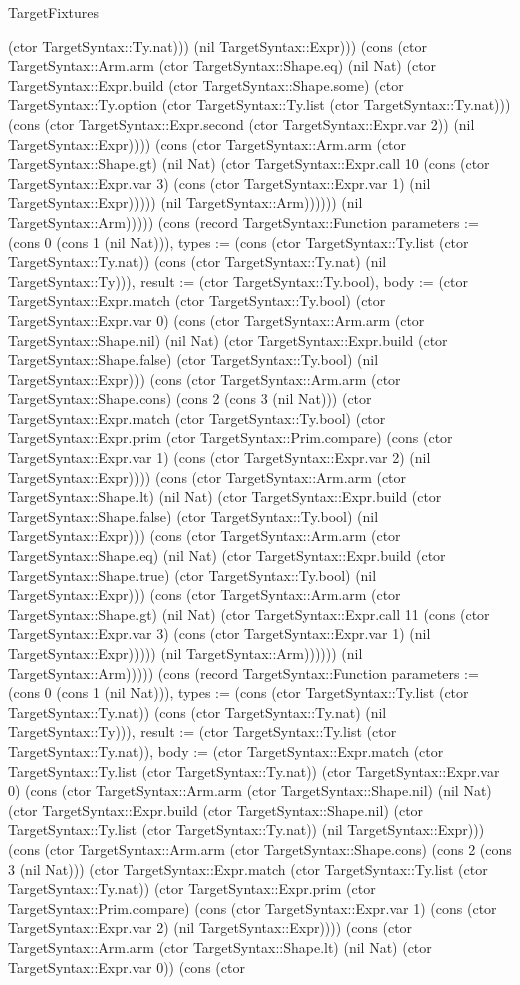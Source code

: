 \begin{lexlean}{TargetFixtures}
\begin{semanticmodule}
{(ctor TargetSyntax::Ty.nat))) (nil TargetSyntax::Expr))) (cons (ctor TargetSyntax::Arm.arm (ctor TargetSyntax::Shape.eq) (nil Nat) (ctor TargetSyntax::Expr.build (ctor TargetSyntax::Shape.some) (ctor TargetSyntax::Ty.option (ctor TargetSyntax::Ty.list (ctor TargetSyntax::Ty.nat))) (cons (ctor TargetSyntax::Expr.second (ctor TargetSyntax::Expr.var 2)) (nil TargetSyntax::Expr)))) (cons (ctor TargetSyntax::Arm.arm (ctor TargetSyntax::Shape.gt) (nil Nat) (ctor TargetSyntax::Expr.call 10 (cons (ctor TargetSyntax::Expr.var 3) (cons (ctor TargetSyntax::Expr.var 1) (nil TargetSyntax::Expr))))) (nil TargetSyntax::Arm)))))) (nil TargetSyntax::Arm))))}) (cons (record TargetSyntax::Function {parameters := (cons 0 (cons 1 (nil Nat))), types := (cons (ctor TargetSyntax::Ty.list (ctor TargetSyntax::Ty.nat)) (cons (ctor TargetSyntax::Ty.nat) (nil TargetSyntax::Ty))), result := (ctor TargetSyntax::Ty.bool), body := (ctor TargetSyntax::Expr.match (ctor TargetSyntax::Ty.bool) (ctor TargetSyntax::Expr.var 0) (cons (ctor TargetSyntax::Arm.arm (ctor TargetSyntax::Shape.nil) (nil Nat) (ctor TargetSyntax::Expr.build (ctor TargetSyntax::Shape.false) (ctor TargetSyntax::Ty.bool) (nil TargetSyntax::Expr))) (cons (ctor TargetSyntax::Arm.arm (ctor TargetSyntax::Shape.cons) (cons 2 (cons 3 (nil Nat))) (ctor TargetSyntax::Expr.match (ctor TargetSyntax::Ty.bool) (ctor TargetSyntax::Expr.prim (ctor TargetSyntax::Prim.compare) (cons (ctor TargetSyntax::Expr.var 1) (cons (ctor TargetSyntax::Expr.var 2) (nil TargetSyntax::Expr)))) (cons (ctor TargetSyntax::Arm.arm (ctor TargetSyntax::Shape.lt) (nil Nat) (ctor TargetSyntax::Expr.build (ctor TargetSyntax::Shape.false) (ctor TargetSyntax::Ty.bool) (nil TargetSyntax::Expr))) (cons (ctor TargetSyntax::Arm.arm (ctor TargetSyntax::Shape.eq) (nil Nat) (ctor TargetSyntax::Expr.build (ctor TargetSyntax::Shape.true) (ctor TargetSyntax::Ty.bool) (nil TargetSyntax::Expr))) (cons (ctor TargetSyntax::Arm.arm (ctor TargetSyntax::Shape.gt) (nil Nat) (ctor TargetSyntax::Expr.call 11 (cons (ctor TargetSyntax::Expr.var 3) (cons (ctor TargetSyntax::Expr.var 1) (nil TargetSyntax::Expr))))) (nil TargetSyntax::Arm)))))) (nil TargetSyntax::Arm))))}) (cons (record TargetSyntax::Function {parameters := (cons 0 (cons 1 (nil Nat))), types := (cons (ctor TargetSyntax::Ty.list (ctor TargetSyntax::Ty.nat)) (cons (ctor TargetSyntax::Ty.nat) (nil TargetSyntax::Ty))), result := (ctor TargetSyntax::Ty.list (ctor TargetSyntax::Ty.nat)), body := (ctor TargetSyntax::Expr.match (ctor TargetSyntax::Ty.list (ctor TargetSyntax::Ty.nat)) (ctor TargetSyntax::Expr.var 0) (cons (ctor TargetSyntax::Arm.arm (ctor TargetSyntax::Shape.nil) (nil Nat) (ctor TargetSyntax::Expr.build (ctor TargetSyntax::Shape.nil) (ctor TargetSyntax::Ty.list (ctor TargetSyntax::Ty.nat)) (nil TargetSyntax::Expr))) (cons (ctor TargetSyntax::Arm.arm (ctor TargetSyntax::Shape.cons) (cons 2 (cons 3 (nil Nat))) (ctor TargetSyntax::Expr.match (ctor TargetSyntax::Ty.list (ctor TargetSyntax::Ty.nat)) (ctor TargetSyntax::Expr.prim (ctor TargetSyntax::Prim.compare) (cons (ctor TargetSyntax::Expr.var 1) (cons (ctor TargetSyntax::Expr.var 2) (nil TargetSyntax::Expr)))) (cons (ctor TargetSyntax::Arm.arm (ctor TargetSyntax::Shape.lt) (nil Nat) (ctor TargetSyntax::Expr.var 0)) (cons (ctor }
\end{semanticmodule}
\end{lexlean}
